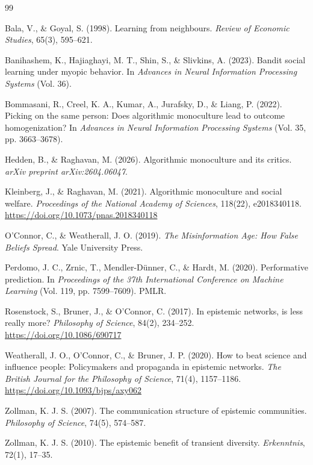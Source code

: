\documentclass[10pt,letterpaper,twocolumn]{article}
\begin{document}
\begin{thebibliography}{99}
\fontsize{8.1}{9.2}\selectfont

 Bala, V., \& Goyal, S. (1998). Learning from neighbours. \emph{Review of Economic Studies}, 65(3), 595--621.

 Banihashem, K., Hajiaghayi, M. T., Shin, S., \& Slivkins, A. (2023). Bandit social learning under myopic behavior. In \emph{Advances in Neural Information Processing Systems} (Vol. 36).

 Bommasani, R., Creel, K. A., Kumar, A., Jurafsky, D., \& Liang, P. (2022). Picking on the same person: Does algorithmic monoculture lead to outcome homogenization? In \emph{Advances in Neural Information Processing Systems} (Vol. 35, pp. 3663--3678).

 Hedden, B., \& Raghavan, M. (2026). Algorithmic monoculture and its critics. \emph{arXiv preprint arXiv:2604.06047}.

 Kleinberg, J., \& Raghavan, M. (2021). Algorithmic monoculture and social welfare. \emph{Proceedings of the National Academy of Sciences}, 118(22), e2018340118. \url{https://doi.org/10.1073/pnas.2018340118}

 O'Connor, C., \& Weatherall, J. O. (2019). \emph{The Misinformation Age: How False Beliefs Spread}. Yale University Press.

 Perdomo, J. C., Zrnic, T., Mendler-D\"unner, C., \& Hardt, M. (2020). Performative prediction. In \emph{Proceedings of the 37th International Conference on Machine Learning} (Vol. 119, pp. 7599--7609). PMLR.

 Rosenstock, S., Bruner, J., \& O'Connor, C. (2017). In epistemic networks, is less really more? \emph{Philosophy of Science}, 84(2), 234--252. \url{https://doi.org/10.1086/690717}

 Weatherall, J. O., O'Connor, C., \& Bruner, J. P. (2020). How to beat science and influence people: Policymakers and propaganda in epistemic networks. \emph{The British Journal for the Philosophy of Science}, 71(4), 1157--1186. \url{https://doi.org/10.1093/bjps/axy062}

 Zollman, K. J. S. (2007). The communication structure of epistemic communities. \emph{Philosophy of Science}, 74(5), 574--587.

 Zollman, K. J. S. (2010). The epistemic benefit of transient diversity. \emph{Erkenntnis}, 72(1), 17--35.

\end{thebibliography}
\end{document}

